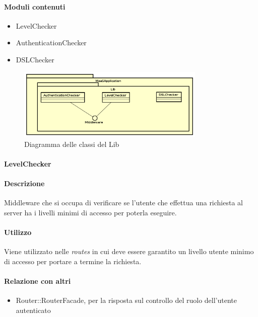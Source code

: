 \paragraph*{Moduli contenuti}
\begin{itemize}
\item LevelChecker
\item AuthenticationChecker
\item DSLChecker
\end{itemize}


\begin{figure}[H]
\centering
\includegraphics[width=0.8\textwidth]{res/sections/backend/lib.png}
\caption{Diagramma delle classi del  Lib}
\end{figure}

\paragraph{LevelChecker}
\paragraph*{Descrizione}
Middleware che si occupa di verificare se l'utente che effettua una richiesta al server ha i livelli minimi di accesso per poterla eseguire.

\paragraph*{Utilizzo}
Viene utilizzato nelle \textit{routes} in cui deve essere garantito un livello utente minimo di accesso per portare a termine la richiesta.

\paragraph*{Relazione con altri }
\begin{itemize}
\item Router::RouterFacade, per la risposta sul controllo del ruolo dell'utente autenticato
\end{itemize}

